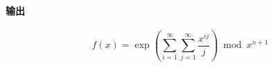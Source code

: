 \paragraph{输出}

\[
    f(x)=\exp\left(\sum_{i=1}^{\infty}\sum_{j=1}^{\infty}\frac{x^{ij}}{j}\right)\bmod{x^{n+1}}
\]

